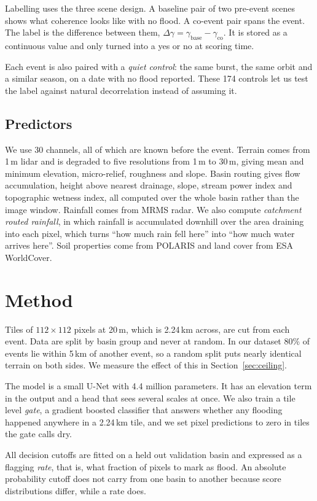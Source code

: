\documentclass[10pt,conference]{IEEEtran}
\begin{document}
Labelling uses the three scene design. A baseline pair of two pre-event scenes
shows what coherence looks like with no flood. A co-event pair spans the event.
The label is the difference between them,
$\Delta\gamma = \gamma_{\mathrm{base}} - \gamma_{\mathrm{co}}$. It is stored as
a continuous value and only turned into a yes or no at scoring time.

Each event is also paired with a \emph{quiet control}: the same burst, the same
orbit and a similar season, on a date with no flood reported. These 174 controls
let us test the label against natural decorrelation instead of assuming it.

\subsection{Predictors}
We use 30 channels, all of which are known before the event. Terrain comes from
1\,m lidar and is degraded to five resolutions from 1\,m to 30\,m, giving mean
and minimum elevation, micro-relief, roughness and slope. Basin routing gives
flow accumulation, height above nearest drainage, slope, stream power index and
topographic wetness index, all computed over the whole basin rather than the
image window. Rainfall comes from MRMS radar. We also compute
\emph{catchment routed rainfall}, in which rainfall is accumulated downhill over
the area draining into each pixel, which turns ``how much rain fell here'' into
``how much water arrives here''. Soil properties come from POLARIS and land
cover from ESA WorldCover.

\section{Method}

Tiles of $112\times112$ pixels at 20\,m, which is 2.24\,km across, are cut from
each event. Data are split by basin group and never at random. In our dataset
80\% of events lie within 5\,km of another event, so a random split puts nearly
identical terrain on both sides. We measure the effect of this in
Section~\ref{sec:ceiling}.

The model is a small U-Net with 4.4 million parameters. It has an elevation term
in the output and a head that sees several scales at once. We also train a tile
level \emph{gate}, a gradient boosted classifier that answers whether any
flooding happened anywhere in a 2.24\,km tile, and we set pixel predictions to
zero in tiles the gate calls dry.

All decision cutoffs are fitted on a held out validation basin and expressed as
a flagging \emph{rate}, that is, what fraction of pixels to mark as flood. An
absolute probability cutoff does not carry from one basin to another because
score distributions differ, while a rate does.
\end{document}
